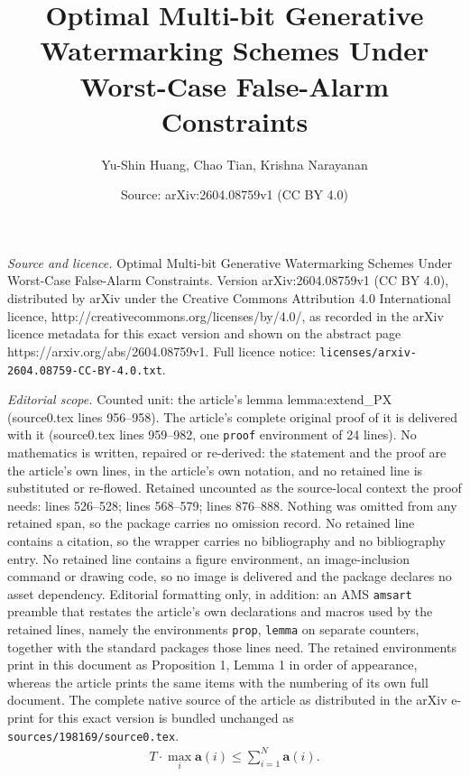 \documentclass[10pt,a4paper]{amsart}
\title{Optimal Multi-bit Generative Watermarking Schemes Under Worst-Case False-Alarm Constraints}
\author{Yu-Shin Huang, Chao Tian, Krishna Narayanan}
\date{Source: arXiv:2604.08759v1 (CC BY 4.0)}
\begin{document}
\maketitle

\noindent\emph{Source and licence.} Optimal Multi-bit Generative Watermarking Schemes Under Worst-Case False-Alarm Constraints. Version arXiv:2604.08759v1 (CC BY 4.0), distributed by arXiv under the Creative Commons Attribution 4.0 International licence, http://creativecommons.org/licenses/by/4.0/, as recorded in the arXiv licence metadata for this exact version and shown on the abstract page https://arxiv.org/abs/2604.08759v1. Full licence notice: \texttt{licenses/arxiv-2604.08759-CC-BY-4.0.txt}.\par\smallskip

\noindent\textit{Editorial scope.} Counted unit: the article's lemma lemma:extend\_PX (source0.tex lines 956--958). The article's complete original proof of it is delivered with it (source0.tex lines 959--982, one \texttt{proof} environment of 24 lines). No mathematics is written, repaired or re-derived: the statement and the proof are the article's own lines, in the article's own notation, and no retained line is substituted or re-flowed.  Retained uncounted as the source-local context the proof needs: lines 526--528; lines 568--579; lines 876--888.  Nothing was omitted from any retained span, so the package carries no omission record.  No retained line contains a citation, so the wrapper carries no bibliography and no bibliography entry.  No retained line contains a figure environment, an image-inclusion command or drawing code, so no image is delivered and the package declares no asset dependency.  Editorial formatting only, in addition: an AMS \texttt{amsart} preamble that restates the article's own declarations and macros used by the retained lines, namely the environments \texttt{prop}, \texttt{lemma} on separate counters, together with the standard packages those lines need.  The retained environments print in this document as Proposition 1, Lemma 1 in order of appearance, whereas the article prints the same items with the numbering of its own full document.  The complete native source of the article as distributed in the arXiv e-print for this exact version is bundled unchanged as \texttt{sources/198169/source0.tex}.
    \begin{align}
        T \cdot \max_i \boldsymbol{a}(i) \leq \sum_{i = 1}^N \boldsymbol{a}(i).\label{eq:T-hot-representable}
    \end{align}
\end{document}
